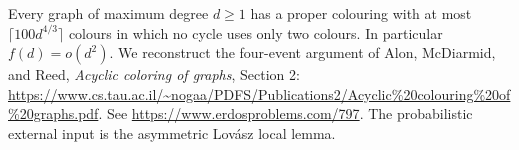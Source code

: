 Every graph of maximum degree \(d\geq1\) has a proper colouring
with at most \(\lceil100d^{4/3}\rceil\) colours in which no cycle
uses only two colours. In particular \(f(d)=o(d^2)\).
We reconstruct the four-event argument of Alon, McDiarmid,
and Reed, \emph{Acyclic coloring of graphs}, Section 2:
\url{https://www.cs.tau.ac.il/~nogaa/PDFS/Publications2/Acyclic%20colouring%20of%20graphs.pdf}.
See \url{https://www.erdosproblems.com/797}.
The probabilistic external input is the asymmetric
Lov\'asz local lemma.

